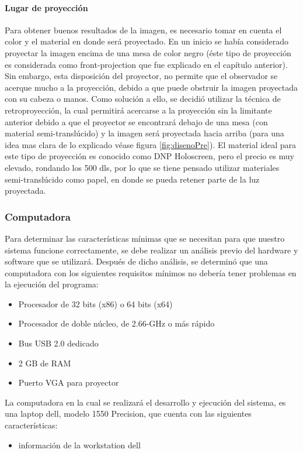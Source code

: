 \documentclass[a4paper,openright,12pt]{report}
\begin{document}
\paragraph{Lugar de proyección}
Para obtener buenos resultados de la imagen, es necesario tomar en cuenta el color y el material en donde será proyectado. En un inicio se había considerado proyectar la imagen encima de una mesa de color negro (éste tipo de proyección es considerada como front-projection que fue explicado en el capítulo anterior). Sin embargo, esta disposición del proyector, no permite que el observador se acerque mucho a la proyección, debido a que puede obstruir la imagen proyectada con su cabeza o manos. Como solución a ello, se decidió utilizar la técnica de retroproyección, la cual permitirá acercarse a la proyección sin la limitante anterior debido a que el proyector se encontrará debajo de una mesa (con material semi-translúcido) y la imagen será proyectada hacia arriba (para una idea mas clara de lo explicado véase figura \ref{fig:disenoPre}). El material ideal para este tipo de proyección es conocido como DNP Holoscreen, pero el precio es muy elevado, rondando los 500 dls, por lo que se tiene pensado utilizar materiales semi-translúcido como papel, en donde se pueda retener parte de la luz proyectada.\\
\subsubsection{Computadora}
Para determinar las características mínimas que se necesitan para que nuestro sistema funcione correctamente, se debe realizar un análisis previo del hardware y software que se utilizará. Después de dicho análisis, se determinó que una computadora con los siguientes requisitos mínimos no debería tener problemas en la ejecución del programa:
\begin{itemize}
	\item Procesador de 32 bits (x86) o 64 bits (x64)
	\item Procesador de doble núcleo, de 2.66-GHz o más rápido
	\item Bus USB 2.0 dedicado
	\item 2 GB de RAM
	\item Puerto VGA para proyector
\end{itemize}
La computadora en la cual se realizará el desarrollo y ejecución del sistema, es una laptop dell, modelo 1550 Precision, que cuenta con las siguientes características: 
\begin{itemize}
	\item información de la workstation dell
\end{itemize}
\end{document}
